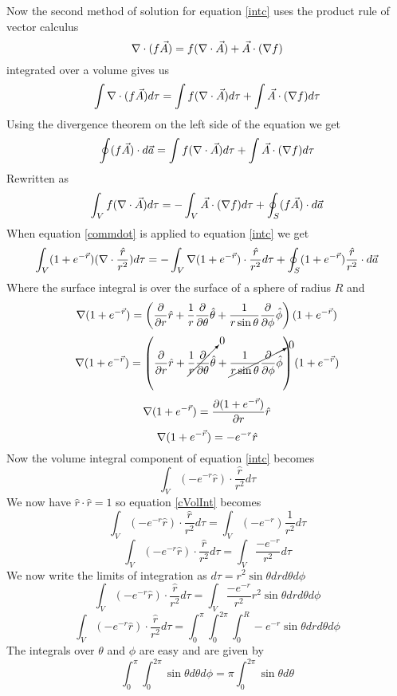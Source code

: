 \documentclass[11pt]{article}
\numberwithin{equation}{section}
\newcommand{\grad}{\bold\nabla}
\begin{document}
\begin{enumerate}[(a)]
Now the second method of solution for equation \ref{intc} uses the product rule of vector calculus 
$$\grad\cdot(f\vec{A}) = f(\grad\cdot\vec{A})+\vec{A}\cdot(\grad f)$$
integrated over a volume gives us
$$\int\grad\cdot(f\vec{A})d\tau = \int f(\grad\cdot\vec{A})d\tau+\int\vec{A}\cdot(\grad f)d\tau$$
Using the divergence theorem on the left side of the equation we get
$$\oint(f\vec{A})\cdot d\vec{a} = \int f(\grad\cdot\vec{A})d\tau+\int\vec{A}\cdot(\grad f)d\tau$$
Rewritten as
\begin{equation}
\int_V f(\grad\cdot\vec{A})d\tau =- \int_V\vec{A}\cdot(\grad f)d\tau + \oint_S(f\vec{A})\cdot d\vec{a} 
\label{commdot}
\end{equation}
When equation \ref{commdot} is applied to equation \ref{intc} we get
$$\int_V (1 + e^{-\vec{r}})(\grad \cdot \frac{\hat{r}}{r^2}) d\tau = -\int_V \grad(1 + e^{-\vec{r}}) \cdot \frac{\hat{r}}{r^2}d\tau + \oint_S(1 + e^{-\vec{r}})\frac{\hat{r}}{r^2} \cdot d\vec{a}$$
Where the surface integral is over the surface of a sphere of radius $R$ and 
$$\grad(1 + e^{-\vec{r}}) =\left(\frac{\partial}{\partial r} \hat{r} + \frac{1}{r}\frac{\partial}{\partial \theta} \hat{\theta} + \frac{1}{r\sin{\theta}}\frac{\partial}{\partial \phi} \hat{\phi} \right)(1 + e^{-\vec{r}})$$ 
$$\grad(1 + e^{-\vec{r}}) =\left(\frac{\partial}{\partial r} \hat{r} + \cancelto{0}{\frac{1}{r}\frac{\partial}{\partial \theta} \hat{\theta}} + \cancelto{0}{\frac{1}{r\sin{\theta}}\frac{\partial}{\partial \phi} \hat{\phi}} \right)(1 + e^{-\vec{r}})$$ 
$$\grad(1 + e^{-\vec{r}}) =\frac{\partial(1 + e^{-\vec{r}})}{\partial r} \hat{r} $$ 
$$\grad(1 + e^{-\vec{r}}) =-e^{-r} \hat{r} $$ 
Now the volume integral component of equation \ref{intc} becomes
\begin{equation}
\int_V (-e^{-r} \hat{r})\cdot \frac{\hat{r}}{r^2} d\tau
\label{cVolInt}
\end{equation}
We now have $\hat{r} \cdot \hat{r} = 1$ so equation \ref{cVolInt} becomes
$$\int_V (-e^{-r} \hat{r})\cdot \frac{\hat{r}}{r^2} d\tau = \int_V (-e^{-r}) \frac{1}{r^2} d\tau$$
$$\int_V (-e^{-r} \hat{r})\cdot \frac{\hat{r}}{r^2} d\tau = \int_V \frac{-e^{-r}}{r^2} d\tau$$
We now write the limits of integration as $d\tau = r^2\sin{\theta}drd\theta d\phi$
$$\int_V (-e^{-r} \hat{r})\cdot \frac{\hat{r}}{r^2} d\tau = \int_V \frac{-e^{-r}}{r^2} r^2\sin{\theta}drd\theta d\phi$$
$$\int_V (-e^{-r} \hat{r})\cdot \frac{\hat{r}}{r^2} d\tau = \int_{0}^{\pi}\int_{0}^{2\pi}\int_{0}^{R} -e^{-r} \sin{\theta}drd\theta d\phi$$
The integrals over $\theta$ and $\phi$ are easy and are given by
$$\int_{0}^{\pi}\int_{0}^{2\pi}\sin{\theta}d\theta d\phi = \pi \int_{0}^{2\pi}\sin{\theta}d\theta$$

\end{enumerate}
\end{document}
